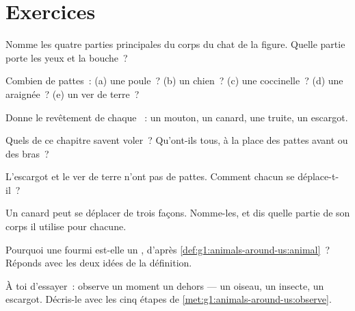 \section{Exercices}

\begin{exercise}[$\star$]\label{exo:g1:animals-around-us:1}
Nomme les quatre parties principales du corps du chat de la figure.
Quelle partie porte les yeux et la bouche~?
\end{exercise}

\begin{exercise}[$\star$]\label{exo:g1:animals-around-us:2}
Combien de pattes~: (a) une poule~? (b) un chien~? (c) une
coccinelle~? (d) une araignée~? (e) un ver de terre~?
\end{exercise}

\begin{exercise}[$\star$]\label{exo:g1:animals-around-us:3}
Donne le revêtement de chaque ~: un mouton, un canard, une
truite, un escargot.
\end{exercise}

\begin{exercise}[$\star$]\label{exo:g1:animals-around-us:4}
Quels  de ce chapitre savent voler~? Qu'ont-ils tous, à la
place des pattes avant ou des bras~?
\end{exercise}

\begin{exercise}[$\star$]\label{exo:g1:animals-around-us:5}
L'escargot et le ver de terre n'ont pas de pattes. Comment chacun
se déplace-t-il~?
\end{exercise}

\begin{exercise}[$\star$]\label{exo:g1:animals-around-us:6}
Un canard peut se déplacer de trois façons. Nomme-les, et dis quelle
partie de son corps il utilise pour chacune.
\end{exercise}

\begin{exercise}[$\star$]\label{exo:g1:animals-around-us:7}
Pourquoi une fourmi est-elle un , d'après
\cref{def:g1:animals-around-us:animal}~? Réponds avec les deux idées
de la définition.
\end{exercise}

\begin{exercise}[$\star$]\label{exo:g1:animals-around-us:8}
À toi d'essayer~: observe un moment un  dehors --- un oiseau,
un insecte, un escargot. Décris-le avec les cinq étapes de
\cref{met:g1:animals-around-us:observe}.
\end{exercise}

